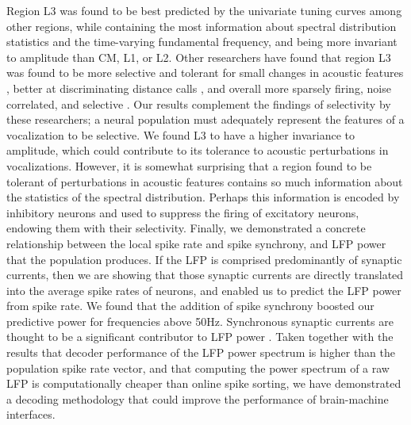     Region L3 was found to be best predicted by the univariate tuning curves among other regions, while containing the most information about spectral distribution statistics and the time-varying fundamental frequency, and being more invariant to amplitude than CM, L1, or L2. Other researchers have found that region L3 was found to be more selective and tolerant for small changes in acoustic features \cite{Meliza2012}, better at discriminating distance calls \cite{Elie2015a}, and overall more sparsely firing, noise correlated, and selective \cite{Calabrese2015}. Our results complement the findings of selectivity by these researchers; a neural population must adequately represent the features of a vocalization to be selective. We found L3 to have a higher invariance to amplitude, which could contribute to its tolerance to acoustic perturbations in vocalizations. However, it is somewhat surprising that a region found to be tolerant of perturbations in acoustic features contains so much information about the statistics of the spectral distribution. Perhaps this information is encoded by inhibitory neurons and used to suppress the firing of excitatory neurons, endowing them with their selectivity.
    Finally, we demonstrated a concrete relationship between the local spike rate and spike synchrony, and LFP power that the population produces. If the LFP is comprised predominantly of synaptic currents, then we are showing that those synaptic currents are directly translated into the average spike rates of neurons, and enabled us to predict the LFP power from spike rate. We found that the addition of spike synchrony boosted our predictive power for frequencies above 50Hz. Synchronous synaptic currents are thought to be a significant contributor to LFP power \cite{REF}. Taken together with the results that decoder performance of the LFP power spectrum is higher than the population spike rate vector, and that computing the power spectrum of a raw LFP is computationally cheaper than online spike sorting, we have demonstrated a decoding methodology that could improve the performance of brain-machine interfaces.


